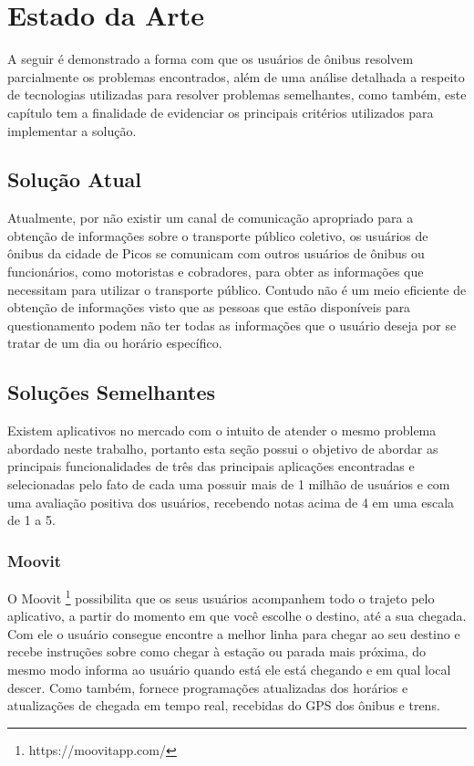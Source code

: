 \chapter{Estado da Arte}

A seguir é demonstrado a forma com que os usuários de ônibus resolvem parcialmente os problemas encontrados, além de uma análise
detalhada a respeito de tecnologias utilizadas para resolver problemas semelhantes, como também, este capítulo tem a finalidade
de evidenciar os principais critérios utilizados para implementar a solução.

\section{Solução Atual}

Atualmente, por não existir um canal de comunicação apropriado para a obtenção de informações sobre o transporte público coletivo, os
usuários de ônibus da cidade de Picos se comunicam com outros usuários de ônibus ou funcionários, como motoristas e cobradores, para obter
as informações que necessitam para utilizar o transporte público. Contudo não é um meio eficiente de obtenção de informações visto que
as pessoas que estão disponíveis para questionamento podem não ter todas as informações que o usuário deseja por se tratar de um dia ou
horário específico.

\section{Soluções Semelhantes}

Existem aplicativos no mercado com o intuito de atender o mesmo problema abordado neste trabalho, portanto esta seção possui o objetivo de abordar as principais funcionalidades de três das principais aplicações encontradas e selecionadas pelo fato de cada uma possuir mais de 1 milhão de usuários e com uma avaliação positiva dos usuários, recebendo notas acima de 4 em uma escala de 1 a 5.

\subsection{Moovit}

O Moovit \footnote{https://moovitapp.com/} possibilita que os seus usuários acompanhem todo o trajeto pelo aplicativo, a partir do momento em que você escolhe o destino, até a sua chegada. Com ele o usuário consegue encontre a melhor linha para chegar ao seu destino e recebe instruções sobre como chegar à estação ou parada mais próxima, do mesmo modo informa ao usuário quando está ele está chegando e em qual local descer. Como também, fornece programações atualizadas dos horários e atualizações de chegada em tempo real, recebidas do GPS dos ônibus e trens.

